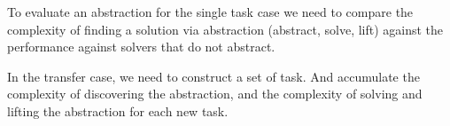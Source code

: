 To evaluate an abstraction for the single task case we need to compare the complexity of
finding a solution via abstraction (abstract, solve, lift) against the performance against
solvers that do not abstract.

In the transfer case, we need to construct a set of task. And accumulate the
complexity of discovering the abstraction, and the complexity of solving
and lifting the abstraction for each new task.

%
%
%
%
